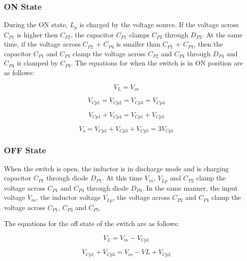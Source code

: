 \subsubsection{ON State}

During the ON state, $L_p$ is charged by the voltage source. If the voltage across $C_{P1}$ is higher then $C_{P2}$, the capacitor $C_{P1}$ clamps $C_{P2}$ through $D_{P2}$. At the same time, if the voltage across $C_{P2}$ + $C_{P4}$ is smaller than $C_{P1}$ + $C_{P3}$, then the capacitor $C_{P1}$ and $C_{P3}$ clamp the voltage across $C_{P2}$ and $C_{P4}$ through $D_{P4}$ and $C_{P4}$ is clamped by $C_{P3}$. The equations for when the switch is in ON position are as follows:

\begin{equation}
	V_L = V_{in} 
	\label{eq:MBC_ON1}
\end{equation} 

\begin{equation}
	V_{Cp1} = V_{Cp2} = V_{Cp3} = V_{Cp4}
	\label{eq:MBC_ON2}
\end{equation} 

\begin{equation}
	V_{Cp1} + V_{Cp4} = V_{Cp1} + V_{Cp3}
	\label{eq:MBC_ON3}
\end{equation} 

\begin{equation}
	V_o = V_{Cp1} + V_{Cp3} + V_{Cp5} = 3V_{Cp1}
	\label{eq:MBC_ON4}
\end{equation}

\subsubsection{OFF State}
When the switch is open, the inductor is in discharge mode and is charging capacitor $C_{P1}$ through diode $D_{P1}$. At this time $V_{in}$, $V_{Lp}$ and $C_{P2}$ clamp the voltage across $C_{P1}$ and $C_{P3}$ through diode $D_{P3}$. In the same manner, the input voltage $V_{in}$, the inductor voltage $V_{Lp}$, the voltage across $C_{P2}$ and $C_{P4}$ clamp the voltage across $C_{P1}$, $C_{P3}$ and $C_{P5}$.

\vspace{15mm}
The equations for the off state of the switch are as follows:

\begin{equation}
	V_L = V_{in} - V_{Cp1}
	\label{eq:MBC_OFF1}
\end{equation}

\begin{equation}
	V_{Cp1} + V_{Cp3} = V_{in} - V{L} + V_{Cp2}
	\label{eq:MBC_OFF2}
\end{equation}
 
